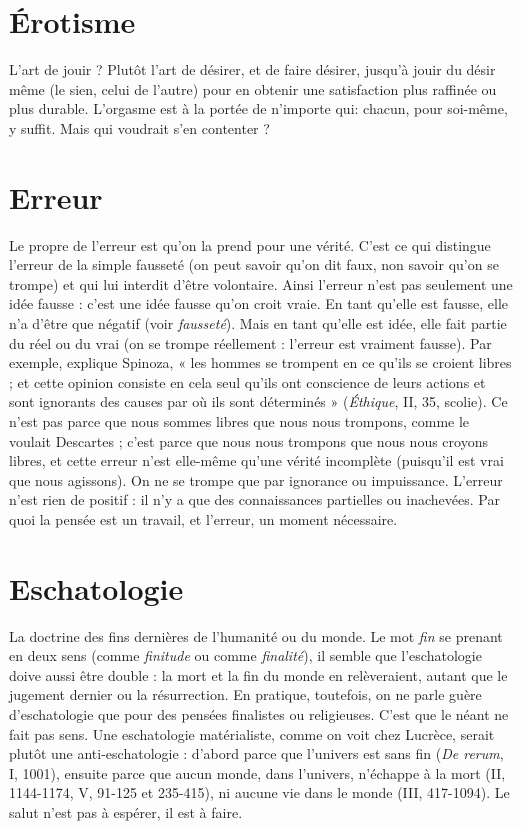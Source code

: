 \section{Érotisme}
L'art de jouir ? Plutôt l’art de désirer, et de faire désirer, jusqu’à
jouir du désir même (le sien, celui de l’autre) pour en obtenir
une satisfaction plus raffinée ou plus durable. L’orgasme est à la portée de
n'importe qui: chacun, pour soi-même, y suffit. Mais qui voudrait s’en
contenter ?

\section{Erreur}
Le propre de l’erreur est qu’on la prend pour une vérité. C’est ce
qui distingue l'erreur de la simple fausseté (on peut savoir qu’on
dit faux, non savoir qu’on se trompe) et qui lui interdit d’être volontaire. Ainsi
l'erreur n’est pas seulement une idée fausse : c’est une idée fausse qu’on croit
vraie. En tant qu’elle est fausse, elle n’a d’être que négatif (voir {\it fausseté}). Mais
en tant qu’elle est idée, elle fait partie du réel ou du vrai (on se trompe
réellement : l'erreur est vraiment fausse). Par exemple, explique Spinoza, « les
hommes se trompent en ce qu’ils se croient libres ; et cette opinion consiste en
cela seul qu’ils ont conscience de leurs actions et sont ignorants des causes par
où ils sont déterminés » ({\it Éthique}, II, 35, scolie). Ce n’est pas parce que nous
sommes libres que nous nous trompons, comme le voulait Descartes ; c’est
parce que nous nous trompons que nous nous croyons libres, et cette erreur
n’est elle-même qu’une vérité incomplète (puisqu'il est vrai que nous agissons).
On ne se trompe que par ignorance ou impuissance. L'erreur n’est rien de
positif : il n’y a que des connaissances partielles ou inachevées. Par quoi la
pensée est un travail, et l'erreur, un moment nécessaire.

\section{Eschatologie}
La doctrine des fins dernières de l’humanité ou du
monde. Le mot {\it fin} se prenant en deux sens (comme
{\it finitude} ou comme {\it finalité}), il semble que l’eschatologie doive aussi être
double : la mort et la fin du monde en relèveraient, autant que le jugement dernier
ou la résurrection. En pratique, toutefois, on ne parle guère d’eschatologie
que pour des pensées finalistes ou religieuses. C’est que le néant ne fait pas sens.
Une eschatologie matérialiste, comme on voit chez Lucrèce, serait plutôt une
anti-eschatologie : d’abord parce que l’univers est sans fin ({\it De rerum}, I, 1001),
ensuite parce que aucun monde, dans l’univers, n’échappe à la mort (II, 1144-1174,
V, 91-125 et 235-415), ni aucune vie dans le monde (III, 417-1094). Le
salut n’est pas à espérer, il est à faire.

